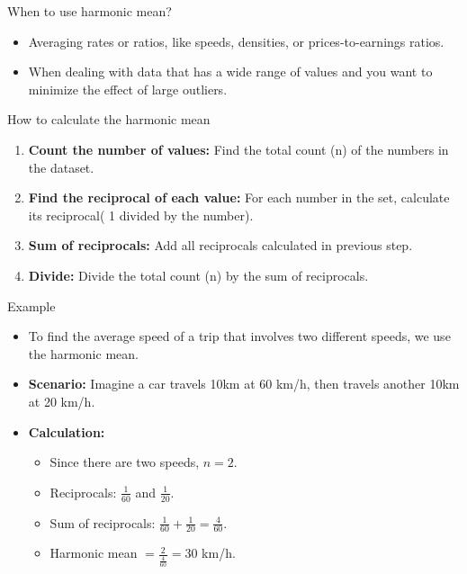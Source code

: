 \documentclass[serif, aspectratio=169]{beamer}
\begin{document}
\begin{frame}{When to use harmonic mean?}

    \begin{itemize}
        \item Averaging rates or ratios, like speeds, densities, or prices-to-earnings ratios.
        \item When dealing with data that has a wide range of values and you want to minimize the effect of large outliers.
    \end{itemize}
    
\end{frame}

\begin{frame}{How to calculate the harmonic mean}

    \begin{enumerate}
        \item \textbf{Count the number of values:} Find the total count (n) of the numbers in the dataset.
        \item \textbf{Find the reciprocal of each value:} For each number in the set, calculate its reciprocal( 1 divided by the number).
        \item \textbf{Sum of reciprocals:} Add all reciprocals calculated in previous step.
        \item \textbf{Divide:} Divide the total count (n) by the sum of reciprocals.
    \end{enumerate}
\end{frame}
\begin{frame}{Example}

    \begin{itemize}
        \item To find the average speed of a trip that involves two different speeds, we use the harmonic mean.
        \item \textbf{Scenario:} Imagine a car travels 10km at 60 km/h, then travels another 10km at 20 km/h.
        \item \textbf{Calculation:}
        \begin{itemize}
            \item Since there are two speeds, $n=2$.
            \item Reciprocals: $\frac{1}{60}$ and $\frac{1}{20}$.
            \item Sum of reciprocals: $\frac{1}{60} + \frac{1}{20} = \frac{4}{60}$.
            \item Harmonic mean $= \frac{2}{\frac{4}{60}}=30$ km/h.
        \end{itemize}
    \end{itemize}
    
\end{frame}
\end{document}

